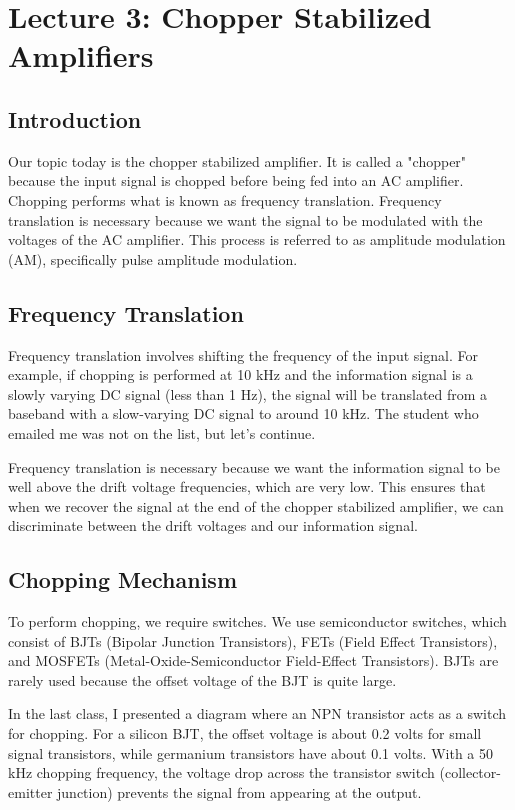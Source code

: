 \section{Lecture 3: Chopper Stabilized Amplifiers}

\subsection{Introduction}
Our topic today is the chopper stabilized amplifier. It is called a "chopper" because the input signal is chopped before being fed into an AC amplifier. Chopping performs what is known as frequency translation. Frequency translation is necessary because we want the signal to be modulated with the voltages of the AC amplifier. This process is referred to as amplitude modulation (AM), specifically pulse amplitude modulation.

\subsection{Frequency Translation}
Frequency translation involves shifting the frequency of the input signal. For example, if chopping is performed at 10 kHz and the information signal is a slowly varying DC signal (less than 1 Hz), the signal will be translated from a baseband with a slow-varying DC signal to around 10 kHz. The student who emailed me was not on the list, but let's continue.

Frequency translation is necessary because we want the information signal to be well above the drift voltage frequencies, which are very low. This ensures that when we recover the signal at the end of the chopper stabilized amplifier, we can discriminate between the drift voltages and our information signal.

\subsection{Chopping Mechanism}
To perform chopping, we require switches. We use semiconductor switches, which consist of BJTs (Bipolar Junction Transistors), FETs (Field Effect Transistors), and MOSFETs (Metal-Oxide-Semiconductor Field-Effect Transistors). BJTs are rarely used because the offset voltage of the BJT is quite large.

In the last class, I presented a diagram where an NPN transistor acts as a switch for chopping. For a silicon BJT, the offset voltage is about 0.2 volts for small signal transistors, while germanium transistors have about 0.1 volts. With a 50 kHz chopping frequency, the voltage drop across the transistor switch (collector-emitter junction) prevents the signal from appearing at the output.

